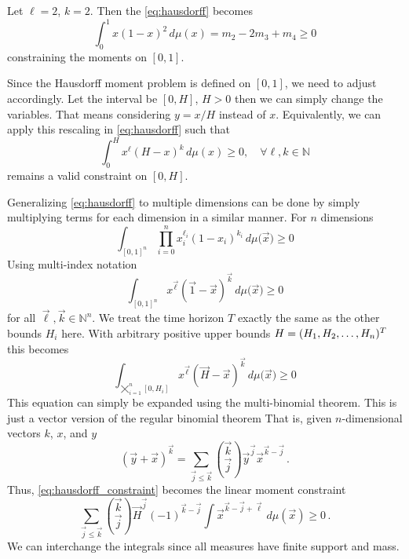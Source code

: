 \begin{example}
	Let $\ell = 2$, $k=2$. Then the \eqref{eq:hausdorff} becomes
	\[
		\int_0^1 x (1 - x)^2 \,d\mu(x) =
		m_2 - 2 m_3 + m_4 \geq 0
	\]
	constraining the moments on $[0,1]$.
\end{example}

Since the Hausdorff moment problem is defined on $[0,1]$, we need to adjust accordingly.
Let the interval be $[0,H]$, $H>0$ then we can simply change the variables.
That means considering $y=x/H$ instead of $x$.
Equivalently, we can apply this rescaling in \eqref{eq:hausdorff} such that
\begin{equation}\label{eq:hausdorff_scaled}
	\int_0^H x^\ell(H-x)^k\,d\mu(x) \geq 0, \quad \forall \ell, k\in\mathbb{N}
\end{equation}
remains a valid constraint on $[0,H]$.

Generalizing \eqref{eq:hausdorff} to multiple dimensions can be done by simply multiplying terms
for each dimension in a similar manner.
For $n$ dimensions
\begin{equation*}
	\int_{{[0,1]}^n}\prod_{i = 0}^n x_i^{\ell_i}{(1-x_i)}^{k_i}\,d\mu{(\vec{x}})\geq 0
\end{equation*}
Using multi-index notation
\begin{equation*}
	\int_{{[0,1]}^n} x^{\vec{\ell}}{(\vec{1}-\vec{x})}^{\vec{k}}\,d\mu{(\vec{x}})\geq 0
\end{equation*}
for all $\vec\ell, \vec{k}\in\mathbb{N}^{n}$.
We treat the time horizon $T$ exactly the same as the other bounds $H_i$ here.
With arbitrary positive upper bounds $H = (H_1, H_2, \dotsc, H_n)^{T}$ this becomes
\begin{equation}\label{eq:hausdorff_constraint}
    \int_{\bigtimes_{i=1}^n[0,H_i]} x^{\vec{\ell}}{(\vec{H}-\vec{x})}^{\vec{k}}\,d\mu{(\vec{x}})\geq 0
\end{equation}
This equation can simply be expanded using the multi-binomial theorem. %
This is just a vector version of the regular binomial theorem
That is, given $n$-dimensional vectors $k$, $x$, and $y$
\[
    (\vec{y}+\vec{x})^{\vec k} =
    \sum_{\vec j\leq\vec k}
    \binom{\vec k}{\vec j} {\vec{y}}^{\vec j}\vec{x}^{\vec k-\vec j}\,.
\]
Thus, \eqref{eq:hausdorff_constraint} becomes the linear moment constraint
\begin{equation}\label{eq:hausdorff_appl}
    \sum_{\vec j\leq \vec k}
    \binom{\vec{k}}{\vec j}
    {\vec{H}}^{\vec{j}} (-1)^{\vec k-\vec j}
    \int
    {\vec x}^{\vec k-\vec j+\vec \ell} \,d\mu(\vec x)\geq 0\,.
\end{equation}
We can interchange the integrals since all measures have finite support and mass.


